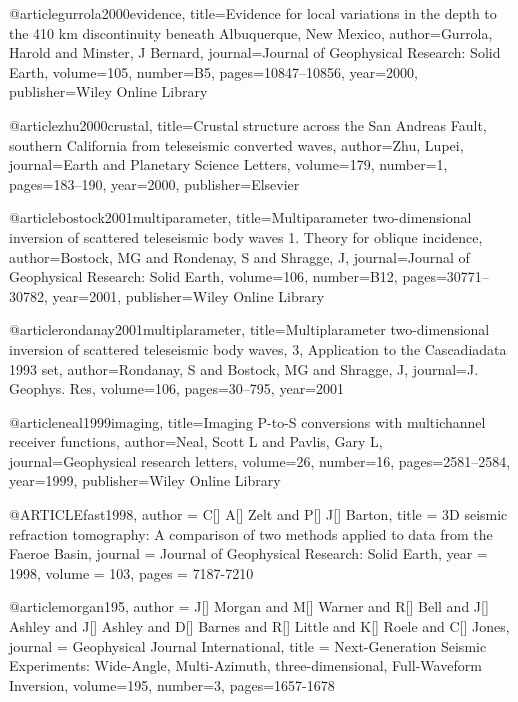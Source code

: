 @article{gurrola2000evidence,
  title={Evidence for local variations in the depth to the 410 km discontinuity beneath Albuquerque, New Mexico},
  author={Gurrola, Harold and Minster, J Bernard},
  journal={Journal of Geophysical Research: Solid Earth},
  volume={105},
  number={B5},
  pages={10847--10856},
  year={2000},
  publisher={Wiley Online Library}
}


@article{zhu2000crustal,
  title={Crustal structure across the San Andreas Fault, southern California from teleseismic converted waves},
  author={Zhu, Lupei},
  journal={Earth and Planetary Science Letters},
  volume={179},
  number={1},
  pages={183--190},
  year={2000},
  publisher={Elsevier}
}

@article{bostock2001multiparameter,
  title={Multiparameter two-dimensional inversion of scattered teleseismic body waves 1. Theory for oblique incidence},
  author={Bostock, MG and Rondenay, S and Shragge, J},
  journal={Journal of Geophysical Research: Solid Earth},
  volume={106},
  number={B12},
  pages={30771--30782},
  year={2001},
  publisher={Wiley Online Library}
}


@article{rondanay2001multiplarameter,
  title={Multiplarameter two-dimensional inversion of scattered teleseismic body waves, 3, Application to the Cascadiadata 1993 set},
  author={Rondanay, S and Bostock, MG and Shragge, J},
  journal={J. Geophys. Res},
  volume={106},
  pages={30--795},
  year={2001}
}



@article{neal1999imaging,
  title={Imaging P-to-S conversions with multichannel receiver functions},
  author={Neal, Scott L and Pavlis, Gary L},
  journal={Geophysical research letters},
  volume={26},
  number={16},
  pages={2581--2584},
  year={1999},
  publisher={Wiley Online Library}
}



@ARTICLE{fast1998,
  author = {C[] A[] Zelt and P[] J[] Barton},
  title = {3D seismic refraction tomography: A comparison of two methods applied to data from the Faeroe Basin},
  journal = {Journal of Geophysical Research: Solid Earth},
  year = {1998},
  volume = {103},
  pages = {7187-7210}
}


@article{morgan195,
author = {J[] Morgan and M[] Warner and R[] Bell and J[] Ashley and J[] Ashley and D[] Barnes and R[] Little and K[] Roele and C[] Jones},
journal = {Geophysical Journal International},
title = {Next-Generation Seismic Experiments: Wide-Angle, Multi-Azimuth, three-dimensional, Full-Waveform Inversion},
volume=195,
number=3,
pages=1657-1678
}

